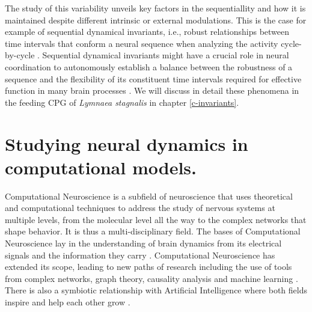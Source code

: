 The study of this variability unveils key factors in the sequentiallity and how it is maintained despite different intrinsic or external modulations. This is the case for example of sequential dynamical invariants, i.e., robust relationships between time intervals that conform a neural sequence when analyzing the activity cycle-by-cycle \parencite{reyes_artificial_2008,elices_robust_2019,garrido-pena_characterization_2021,berbel_emergence_2024}. Sequential dynamical invariants might have a crucial role in neural coordination to autonomously establish a balance between the robustness of a sequence and the flexibility of its constituent time intervals required for effective function in many brain processes \parencite{tatsuno_analysis_2015,ullen_neural_2003,zimnik_independent_2021,zhou_neural_2020,dragoi_cell_2020}. We will discuss in detail these phenomena in the feeding CPG of \textit{Lymnaea stagnalis} in chapter \ref{c-invariants}.


\section{Studying neural dynamics in computational models.}
\label{sec:computational neuroscience}
Computational Neuroscience is a subfield of neuroscience that uses theoretical and computational techniques to address the study of nervous systems at multiple levels, from the molecular level all the way to the complex networks that shape behavior. It is thus a multi-disciplinary field. The bases of Computational Neuroscience lay in the understanding of brain dynamics from its electrical signals and the information they carry \parencite{hodgkin_quantitative_1952,schwiening_brief_2012,catterall_hodgkinhuxley_2012,dimitrov_information_2011,shannon_mathematical_1948}. Computational Neuroscience has extended its scope, leading to new paths of research including the use of tools from complex networks, graph theory, causality analysis and machine learning \parencite{_30th_2021}. There is also a symbiotic relationship with Artificial Intelligence where both fields inspire and help each other grow \parencite{amunts_human_2019,wozniak_deep_2020,goncalves_training_2020}.

